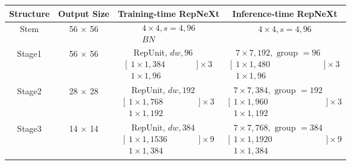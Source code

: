\documentclass[preprint,12pt]{elsarticle}
\begin{document}
\begin{table}[t]
\centering
\small
\begin{adjustbox}{center}
\begin{tabular}{cc|c|c}
\multicolumn{1}{c|}{Structure} & Output Size & Training-time RepNeXt & Inference-time RepNeXt \\ \hline
\multicolumn{1}{c|}{Stem} & 56 $\times$ 56 & $\begin{array}{c} 4 \times 4,s=4,96 \\ BN \end{array}$ & $4 \times 4,s=4,96$ \\ \hline
\multicolumn{1}{c|}{Stage1} & 56 $\times$ 56 & $\bigg [\begin{array}{c}\text { RepUnit, } d w, 96 \\ 1 \times 1,384 \\ 1 \times 1,96\end{array}\bigg ] \times 3$ & $\bigg [\begin{array}{c}7 \times 7,192, \text { group }=96 \\ 1 \times 1,480 \\ 1 \times 1,96\end{array}\bigg ] \times 3$ \\ \hline
\multicolumn{1}{c|}{Stage2} & 28 $\times$ 28 & $\bigg [\begin{array}{c}\text { RepUnit, } d w, 192 \\ 1 \times 1,768 \\ 1 \times 1,192\end{array}\bigg ] \times 3$ & $\bigg [\begin{array}{c}7 \times 7,384, \text { group }=192 \\ 1 \times 1,960 \\ 1 \times 1,192\end{array}\bigg ] \times 3$ \\ \hline
\multicolumn{1}{c|}{Stage3} & 14 $\times$ 14 & $\bigg [\begin{array}{c}\text { RepUnit, } d w, 384 \\ 1 \times 1,1536 \\ 1 \times 1,384\end{array}\bigg ] \times 9$ & $\bigg [\begin{array}{c}7 \times 7,768, \text { group }=384 \\ 1 \times 1,1920 \\ 1 \times 1,384\end{array}\bigg] \times 9$ \\ \hline

\end{tabular}
\end{adjustbox}
\end{table}
\end{document}
